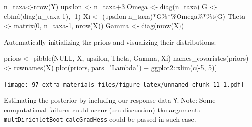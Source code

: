 \documentclass[
]{book}
\newenvironment{Shaded}{\begin{snugshade}}{\end{snugshade}}
\newcommand{\AttributeTok}[1]{\textcolor[rgb]{0.77,0.63,0.00}{#1}}
\newcommand{\ConstantTok}[1]{\textcolor[rgb]{0.00,0.00,0.00}{#1}}
\newcommand{\DecValTok}[1]{\textcolor[rgb]{0.00,0.00,0.81}{#1}}
\newcommand{\FunctionTok}[1]{\textcolor[rgb]{0.00,0.00,0.00}{#1}}
\newcommand{\NormalTok}[1]{#1}
\newcommand{\OtherTok}[1]{\textcolor[rgb]{0.56,0.35,0.01}{#1}}
\newcommand{\SpecialCharTok}[1]{\textcolor[rgb]{0.00,0.00,0.00}{#1}}
\newcommand{\StringTok}[1]{\textcolor[rgb]{0.31,0.60,0.02}{#1}}
\begin{document}
\begin{Shaded}
\begin{Highlighting}[]
\NormalTok{n\_taxa}\OtherTok{\textless{}{-}}\FunctionTok{nrow}\NormalTok{(Y)}
\NormalTok{upsilon }\OtherTok{\textless{}{-}}\NormalTok{ n\_taxa}\SpecialCharTok{+}\DecValTok{3}
\NormalTok{Omega }\OtherTok{\textless{}{-}} \FunctionTok{diag}\NormalTok{(n\_taxa)}
\NormalTok{G }\OtherTok{\textless{}{-}} \FunctionTok{cbind}\NormalTok{(}\FunctionTok{diag}\NormalTok{(n\_taxa}\DecValTok{{-}1}\NormalTok{), }\SpecialCharTok{{-}}\DecValTok{1}\NormalTok{)}
\NormalTok{Xi }\OtherTok{\textless{}{-}}\NormalTok{ (upsilon}\SpecialCharTok{{-}}\NormalTok{n\_taxa)}\SpecialCharTok{*}\NormalTok{G}\SpecialCharTok{\%*\%}\NormalTok{Omega}\SpecialCharTok{\%*\%}\FunctionTok{t}\NormalTok{(G)}
\NormalTok{Theta }\OtherTok{\textless{}{-}} \FunctionTok{matrix}\NormalTok{(}\DecValTok{0}\NormalTok{, n\_taxa}\DecValTok{{-}1}\NormalTok{, }\FunctionTok{nrow}\NormalTok{(X))}
\NormalTok{Gamma }\OtherTok{\textless{}{-}} \FunctionTok{diag}\NormalTok{(}\FunctionTok{nrow}\NormalTok{(X))}
\end{Highlighting}
\end{Shaded}

Automatically initializing the priors and visualizing their distributions:

\begin{Shaded}
\begin{Highlighting}[]
\NormalTok{priors }\OtherTok{\textless{}{-}} \FunctionTok{pibble}\NormalTok{(}\ConstantTok{NULL}\NormalTok{, X, upsilon, Theta, Gamma, Xi)}
\FunctionTok{names\_covariates}\NormalTok{(priors) }\OtherTok{\textless{}{-}} \FunctionTok{rownames}\NormalTok{(X)}
\FunctionTok{plot}\NormalTok{(priors, }\AttributeTok{pars=}\StringTok{"Lambda"}\NormalTok{) }\SpecialCharTok{+}\NormalTok{ ggplot2}\SpecialCharTok{::}\FunctionTok{xlim}\NormalTok{(}\FunctionTok{c}\NormalTok{(}\SpecialCharTok{{-}}\DecValTok{5}\NormalTok{, }\DecValTok{5}\NormalTok{))}
\end{Highlighting}
\end{Shaded}

\texttt{[image: 97\_extra\_materials\_files/figure-latex/unnamed-chunk-11-1.pdf]}

Estimating the posterior by including our response data \texttt{Y}.
Note: Some computational failures could occur (see \href{https://github-wiki-see.page/m/jsilve24/fido/wiki/Frequently-Asked-Questions}{discussion})
the arguments \texttt{multDirichletBoot} \texttt{calcGradHess} could be passed in such case.
\end{document}
